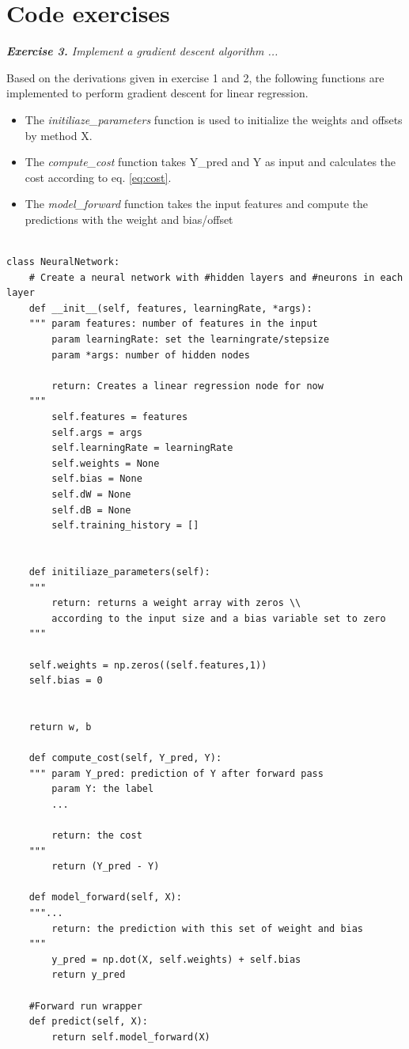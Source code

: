\documentclass[a4paper,10pt]{article}
\begin{document}
\section{Code exercises}

\hfill \break
\textit{\textbf{Exercise 3.} Implement a gradient descent algorithm ...}

Based on the derivations given in exercise 1 and 2, the following functions are implemented to perform gradient descent for linear regression. 

\begin{itemize}
\item
The \emph{initiliaze\_parameters} function is used to initialize the weights and offsets by method X.
\item
The \emph{compute\_cost} function takes Y\_pred and Y as input and calculates the cost according to eq. \eqref{eq:cost}.
\item The \emph{model\_forward} function takes the input features and compute the predictions with the weight and bias/offset
\end{itemize}

\begin{lstlisting}

class NeuralNetwork:
    # Create a neural network with #hidden layers and #neurons in each layer
    def __init__(self, features, learningRate, *args):
    """ param features: number of features in the input
        param learningRate: set the learningrate/stepsize
        param *args: number of hidden nodes
        
        return: Creates a linear regression node for now 
    """
        self.features = features
        self.args = args
        self.learningRate = learningRate
        self.weights = None
        self.bias = None
        self.dW = None
        self.dB = None
        self.training_history = []


    def initiliaze_parameters(self):
    """ 
        return: returns a weight array with zeros \\
        according to the input size and a bias variable set to zero
    """

    self.weights = np.zeros((self.features,1))
    self.bias = 0
    
    
    return w, b

    def compute_cost(self, Y_pred, Y):
    """ param Y_pred: prediction of Y after forward pass
        param Y: the label
        ...
        
        return: the cost
    """ 
        return (Y_pred - Y)

    def model_forward(self, X):
    """...       
        return: the prediction with this set of weight and bias
    """ 
        y_pred = np.dot(X, self.weights) + self.bias
        return y_pred

    #Forward run wrapper
    def predict(self, X):
        return self.model_forward(X)


\end{lstlisting}
\end{document}
